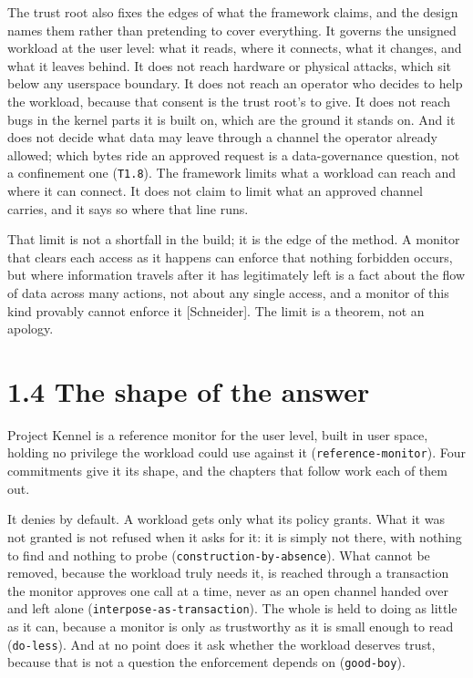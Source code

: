 The trust root also fixes the edges of what the framework claims, and
the design names them rather than pretending to cover everything. It
governs the unsigned workload at the user level: what it reads, where it
connects, what it changes, and what it leaves behind. It does not reach
hardware or physical attacks, which sit below any userspace boundary. It
does not reach an operator who decides to help the workload, because
that consent is the trust root's to give. It does not reach bugs in the
kernel parts it is built on, which are the ground it stands on. And it
does not decide what data may leave through a channel the operator
already allowed; which bytes ride an approved request is a
data-governance question, not a confinement one (\texttt{T1.8}). The
framework limits what a workload can reach and where it can connect. It
does not claim to limit what an approved channel carries, and it says so
where that line runs.

That limit is not a shortfall in the build; it is the edge of the
method. A monitor that clears each access as it happens can enforce that
nothing forbidden occurs, but where information travels after it has
legitimately left is a fact about the flow of data across many actions,
not about any single access, and a monitor of this kind provably cannot
enforce it {[}Schneider{]}. The limit is a theorem, not an apology.

\hypertarget{the-shape-of-the-answer}{%
\section{1.4 The shape of the answer}\label{the-shape-of-the-answer}}

Project Kennel is a reference monitor for the user level, built in user
space, holding no privilege the workload could use against it
(\texttt{reference-monitor}). Four commitments give it its shape, and
the chapters that follow work each of them out.

It denies by default. A workload gets only what its policy grants. What
it was not granted is not refused when it asks for it: it is simply not
there, with nothing to find and nothing to probe
(\texttt{construction-by-absence}). What cannot be removed, because the
workload truly needs it, is reached through a transaction the monitor
approves one call at a time, never as an open channel handed over and
left alone (\texttt{interpose-as-transaction}). The whole is held to
doing as little as it can, because a monitor is only as trustworthy as
it is small enough to read (\texttt{do-less}). And at no point does it
ask whether the workload deserves trust, because that is not a question
the enforcement depends on (\texttt{good-boy}).

